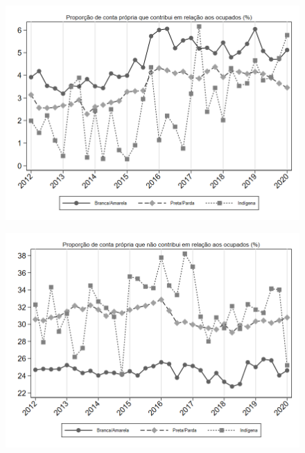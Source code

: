 \begin{frame}[label=_composicao_demografica_raca_prop_cpropriaC]{}
\textit{\hyperlink{_composicao_demografica_raca}{}}
\begin{figure}
  \centering
  \includegraphics[width=1.0\linewidth]{../../analysis/output/composicao_demografica/raca/_composicao_demografica_raca_prop_cpropriaC.png}
  \caption{}
  \label{fig:_composicao_demografica_raca_prop_cpropriaC}
\end{figure}
\end{frame}

\begin{frame}[label=_composicao_demografica_raca_prop_cpropriaNc]{}
\textit{\hyperlink{_composicao_demografica_raca}{}}
\begin{figure}
  \centering
  \includegraphics[width=1.0\linewidth]{../../analysis/output/composicao_demografica/raca/_composicao_demografica_raca_prop_cpropriaNc.png}
  \caption{}
  \label{fig:_composicao_demografica_raca_prop_cpropriaNc}
\end{figure}
\end{frame}